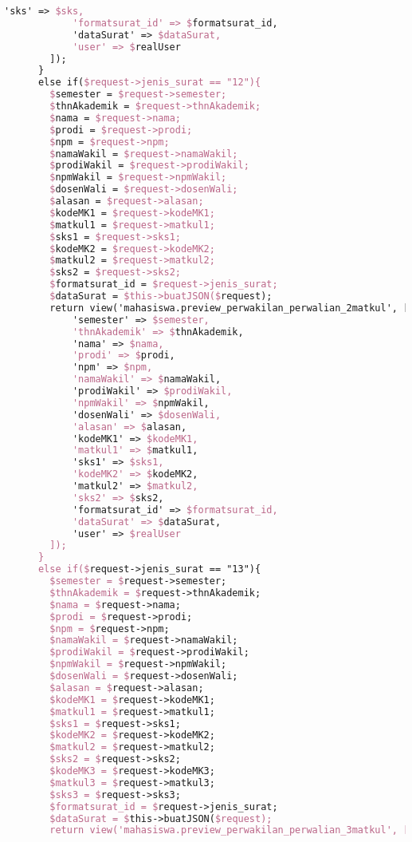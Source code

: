 \begin{lstlisting}[language=tex,basicstyle=\tiny,caption=PesanansuratController.php]
            'sks' => $sks,
            'formatsurat_id' => $formatsurat_id,
            'dataSurat' => $dataSurat,
            'user' => $realUser
        ]);
      }
      else if($request->jenis_surat == "12"){
        $semester = $request->semester;
        $thnAkademik = $request->thnAkademik;
        $nama = $request->nama;
        $prodi = $request->prodi;
        $npm = $request->npm;
        $namaWakil = $request->namaWakil;
        $prodiWakil = $request->prodiWakil;
        $npmWakil = $request->npmWakil;
        $dosenWali = $request->dosenWali;
        $alasan = $request->alasan;
        $kodeMK1 = $request->kodeMK1;
        $matkul1 = $request->matkul1;
        $sks1 = $request->sks1;
        $kodeMK2 = $request->kodeMK2;
        $matkul2 = $request->matkul2;
        $sks2 = $request->sks2;
        $formatsurat_id = $request->jenis_surat;
        $dataSurat = $this->buatJSON($request);
        return view('mahasiswa.preview_perwakilan_perwalian_2matkul', [
            'semester' => $semester,
            'thnAkademik' => $thnAkademik,
            'nama' => $nama,
            'prodi' => $prodi,
            'npm' => $npm,
            'namaWakil' => $namaWakil,
            'prodiWakil' => $prodiWakil,
            'npmWakil' => $npmWakil,
            'dosenWali' => $dosenWali,
            'alasan' => $alasan,
            'kodeMK1' => $kodeMK1,
            'matkul1' => $matkul1,
            'sks1' => $sks1,
            'kodeMK2' => $kodeMK2,
            'matkul2' => $matkul2,
            'sks2' => $sks2,
            'formatsurat_id' => $formatsurat_id,
            'dataSurat' => $dataSurat,
            'user' => $realUser
        ]);
      }
      else if($request->jenis_surat == "13"){
        $semester = $request->semester;
        $thnAkademik = $request->thnAkademik;
        $nama = $request->nama;
        $prodi = $request->prodi;
        $npm = $request->npm;
        $namaWakil = $request->namaWakil;
        $prodiWakil = $request->prodiWakil;
        $npmWakil = $request->npmWakil;
        $dosenWali = $request->dosenWali;
        $alasan = $request->alasan;
        $kodeMK1 = $request->kodeMK1;
        $matkul1 = $request->matkul1;
        $sks1 = $request->sks1;
        $kodeMK2 = $request->kodeMK2;
        $matkul2 = $request->matkul2;
        $sks2 = $request->sks2;
        $kodeMK3 = $request->kodeMK3;
        $matkul3 = $request->matkul3;
        $sks3 = $request->sks3;
        $formatsurat_id = $request->jenis_surat;
        $dataSurat = $this->buatJSON($request);
        return view('mahasiswa.preview_perwakilan_perwalian_3matkul', [

\end{lstlisting}

